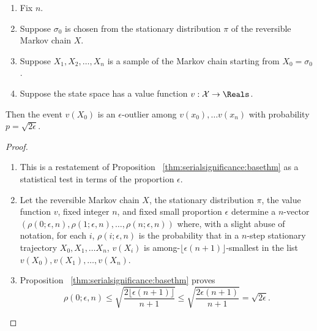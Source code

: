 \documentclass[12pt]{article}
\begin{document}
\begin{example}
\begin{corollary}
    \label{thm:serialsignificance:sqrtepstest}
    \begin{enumerate}
        \item
            Fix \( n \).
        \item
            Suppose \( \sigma_0 \) is chosen from the stationary
            distribution \( \pi \) of the reversible Markov chain \( X \).
        \item
            Suppose \( X_1, X_2, \dots, X_n \) is a sample of the Markov
            chain starting from \( X_0 = \sigma_0 \).
        \item
            Suppose the state space has a value function \( v :
            \mathcal {X} \to \Reals \).
    \end{enumerate}
    Then the event \( v(X_0) \) is an \( \epsilon \)-outlier among \( v(x_0),
    \dots v(x_n ) \) with probability \( p = \sqrt{2\epsilon} \).
\end{corollary}

\begin{proof}
    \begin{enumerate}
        \item
            This is a restatement of Proposition~%
            \ref{thm:serialsignificance:basethm} as a statistical test
            in terms of the proportion \( \epsilon \).
        \item
            Let the reversible Markov chain \( X \), the stationary
            distribution \( \pi \), the value function \( v \), fixed
            integer \( n \), and fixed small proportion \( \epsilon \)
            determine a \( n \)-vector \( (\rho(0; \epsilon, n), \rho(1;
            \epsilon, n), \dots, \rho(n; \epsilon, n)) \) where, with a
            slight abuse of notation, for each \( i \), \( \rho(i;
            \epsilon, n) \) is the probability that in a \( n \)-step
            stationary trajectory \( X_0, X_1, \dots X_n \), \( v(X_i) \)
            is among-\( \lfloor \epsilon(n+1) \rfloor \)-smallest in the
            list \( v(X_0), v(X_1), \dots, v(X_n) \).
        \item
            Proposition~%
            \ref{thm:serialsignificance:basethm} proves
            \[
                \rho(0; \epsilon, n) \le \sqrt{\frac{2 \lfloor \epsilon
                (n+1) \rfloor}{n+1}} \le \sqrt{\frac{2 \epsilon (n+1)}{n+1}}
                = \sqrt{2\epsilon}.
            \]
    \end{enumerate}
\end{proof}


\end{example}
\end{document}
